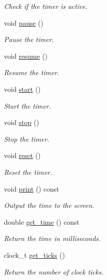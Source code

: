 \begin{DoxyCompactItemize}
\begin{DoxyCompactList}\small\item\em Check if the timer is active. \end{DoxyCompactList}\item 
void \hyperlink{classLuna_1_1Timer_af2663caeb132da9375669733ac826cc8}{pause} ()
\begin{DoxyCompactList}\small\item\em Pause the timer. \end{DoxyCompactList}\item 
void \hyperlink{classLuna_1_1Timer_abf0e92e9d430cdf42c0ebe21e8220c91}{resume} ()
\begin{DoxyCompactList}\small\item\em Resume the timer. \end{DoxyCompactList}\item 
void \hyperlink{classLuna_1_1Timer_ab074740a502b02be0bb64ef3320733b3}{start} ()
\begin{DoxyCompactList}\small\item\em Start the timer. \end{DoxyCompactList}\item 
void \hyperlink{classLuna_1_1Timer_ad8ba9deb09bfe422cfaadba04a776662}{stop} ()
\begin{DoxyCompactList}\small\item\em Stop the timer. \end{DoxyCompactList}\item 
void \hyperlink{classLuna_1_1Timer_a7aee89c76f083206cb1ce7fd150f4e81}{reset} ()
\begin{DoxyCompactList}\small\item\em Reset the timer. \end{DoxyCompactList}\item 
void \hyperlink{classLuna_1_1Timer_ac0292bd7a6e45b269919fc2fe160a8bf}{print} () const
\begin{DoxyCompactList}\small\item\em Output the time to the screen. \end{DoxyCompactList}\item 
double \hyperlink{classLuna_1_1Timer_ac8b59a9f3d149ec56156af6f74a6d1a9}{get\+\_\+time} () const
\begin{DoxyCompactList}\small\item\em Return the time in milliseconds. \end{DoxyCompactList}\item 
clock\+\_\+t \hyperlink{classLuna_1_1Timer_a7b9ca4a1299e21bb5690aa960612ae9e}{get\+\_\+ticks} ()
\begin{DoxyCompactList}\small\item\em Return the number of clock ticks. \end{DoxyCompactList}\end{DoxyCompactItemize}


